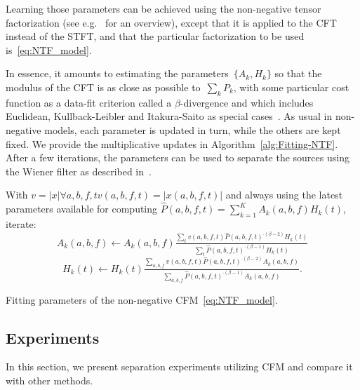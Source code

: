 Learning those parameters can be achieved using the non-negative tensor factorization (see e.g.~\cite{cichoki09,ozerov12,smaragdis14} for an overview), except that it is applied to the CFT instead of the \acs{STFT}, and that the particular factorization to be used is~\eqref{eq:NTF_model}.

In essence, it amounts to estimating the parameters~$\{ A_{k},H_{k}\}$ so that the modulus of the CFT is as close as possible to~$\sum_{k}P_{k}$, with some particular cost function as a data-fit criterion called a $\beta$-divergence and which includes Euclidean, Kullback-Leibler and Itakura-Saito as special cases~\cite{fitzgerald08a}. 
As usual in non-negative models, each parameter is updated in turn, while the others are kept fixed.
We provide the multiplicative updates in Algorithm~\ref{alg:Fitting-NTF}.
After a few iterations, the parameters can be used to separate the sources using the Wiener filter as described in~\cite{liutkus15}.

\begin{algorithm}
With $v=\left|x\right| \forall a,b,f,t v(a,b,f,t) = |x(a,b,f,t)|$ and always using the latest
parameters available for computing
 $\hat{P}\left(a,b,f,t\right)=\sum\limits_{k=1}^{K}A_{k}\left(a,b,f\right)H_{k}\left(t\right)$,
iterate:
\[
A_{k}\left(a,b,f\right)\leftarrow A_{k}\left(a,b,f\right)\tfrac{\sum_{t}v\left(a,b,f,t\right)\hat{P}\left(a,b,f,t\right)^{\cdot\left(\beta-2\right)}H_{k}\left(t\right)}{\sum_{t}\hat{P}\left(a,b,f,t\right)^{\cdot\left(\beta-1\right)}H_{k}\left(t\right)}
\]
\[
H_{k}\left(t\right)\leftarrow H_{k}\left(t\right)\tfrac{\sum_{a,b,f}v\left(a,b,f,t\right)\hat{P}\left(a,b,f,t\right)^{\cdot\left(\beta-2\right)}A_{k}\left(a,b,f\right)}{\sum_{a,b,f}\hat{P}\left(a,b,f,t\right)^{\cdot\left(\beta-1\right)}A_{k}\left(a,b,f\right)}.
\]
\caption{Fitting parameters of the non-negative CFM~\eqref{eq:NTF_model}.\label{alg:Fitting-NTF}}
\end{algorithm}

\subsection{Experiments}
\label{sec:experiment}

In this section, we present separation experiments utilizing CFM and compare it with other methods.

